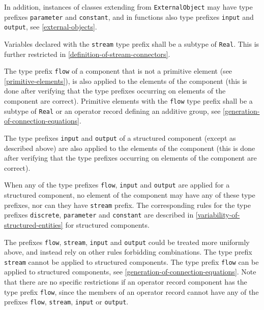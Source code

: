 In addition, instances of classes extending from \lstinline!ExternalObject! may have type prefixes \lstinline!parameter! and \lstinline!constant!, and in functions also type prefixes
\lstinline!input! and \lstinline!output!, see \cref{external-objects}.

Variables declared with the \lstinline!stream! type prefix shall be a subtype of \lstinline!Real!.
This is further restricted in \cref{definition-of-stream-connectors}.

The type prefix \lstinline!flow! of a component that is not a primitive element (see \cref{primitive-elements}), is also applied to the elements of the component (this is done after verifying that the type prefixes occurring on elements of the component are correct).
Primitive elements with the \lstinline!flow! type prefix shall be a subtype of \lstinline!Real! or an operator record defining an additive group, see \cref{generation-of-connection-equations}.

The type prefixes \lstinline!input! and \lstinline!output! of a structured component (except as described above) are also applied to the elements of the component (this is done after verifying that the type prefixes occurring on elements of the component are correct).

When any of the type prefixes \lstinline!flow!, \lstinline!input! and \lstinline!output! are applied for a structured component, no element of the component may have any of these type prefixes, nor can they have \lstinline!stream! prefix.
The corresponding rules for the type prefixes \lstinline!discrete!, \lstinline!parameter! and \lstinline!constant! are described in \cref{variability-of-structured-entities} for structured components.

\begin{nonnormative}
The prefixes \lstinline!flow!, \lstinline!stream!, \lstinline!input! and \lstinline!output! could be treated more uniformly above, and instead rely on other rules forbidding combinations.
The type prefix \lstinline!stream! cannot be applied to structured components.
The type prefix \lstinline!flow! can be applied to structured components, see \cref{generation-of-connection-equations}.
Note that there are no specific restrictions if an operator record component has the type prefix \lstinline!flow!, since the members of an operator record cannot have any of the prefixes \lstinline!flow!, \lstinline!stream!, \lstinline!input! or \lstinline!output!.
\end{nonnormative}

